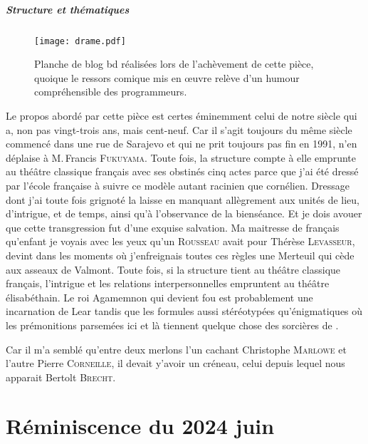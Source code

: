 \paragraph{Structure et thématiques}
\begin{figure}[!t]
	\centering
	\texttt{[image: drame.pdf]}
	\caption{Planche de blog bd réalisées lors de l’achèvement de cette pièce, quoique le ressors comique mis en œuvre relève d’un humour compréhensible des programmeurs.}
\end{figure}
Le  propos abordé par cette pièce est certes éminemment celui de notre siècle qui a, non pas vingt-trois ans, mais cent-neuf. Car il s’agit toujours du même siècle commencé dans une rue de Sarajevo et qui ne prit toujours pas fin en 1991, n’en déplaise à M.\,Francis \textsc{Fukuyama}. Toute fois, la structure compte à elle emprunte au théâtre classique français avec ses obstinés cinq actes parce que j’ai été dressé par l’école française à suivre ce modèle autant racinien que cornélien. Dressage dont j’ai toute fois grignoté la laisse en manquant allègrement aux unités de lieu, d’intrigue, et de temps, ainsi qu’à l’observance de la bienséance. Et je dois avouer que cette transgression fut d’une exquise salvation. Ma maitresse de français qu’enfant je voyais avec les yeux qu’un \textsc{Rousseau} avait pour Thérèse \textsc{Levasseur}, devint dans les moments où j’enfreignais toutes ces règles une Merteuil qui cède aux asseaux de Valmont. Toute fois, si la structure tient au théâtre classique français, l’intrigue et les relations interpersonnelles empruntent au théâtre élisabéthain. Le roi Agamemnon qui devient fou est probablement une incarnation de Lear tandis que les formules aussi stéréotypées qu’énigmatiques où les prémonitions parsemées ici et là tiennent quelque chose des sorcières de .

Car il m’a semblé qu’entre deux merlons l’un cachant Christophe \textsc{Marlowe} et l’autre Pierre \textsc{Corneille}, il devait y’avoir un créneau, celui depuis lequel nous apparait Bertolt \textsc{Brecht}.


\chapter{Réminiscence du 2024 juin}

